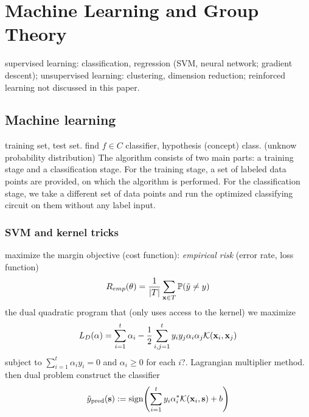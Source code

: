 \printbibliography
\appendix

\section{Machine Learning and Group Theory}
supervised learning: classification, regression
(SVM, neural network; gradient descent);
unsupervised learning: clustering, dimension reduction;
reinforced learning not discussed in this paper.
\subsection{Machine learning}
training set, test set.
find $f\in C$ classifier, hypothesis (concept) class. (unknow probability distribution)
The algorithm consists of two main parts: a training stage and a classification stage. 
For the training stage, a set of labeled data points are provided, on which the algorithm is performed. 
For the classification stage, we take a different set of data points and run the optimized classifying circuit on them without any label input.

\subsubsection{SVM and kernel tricks}
maximize the margin
objective (cost function): \emph{empirical risk} (error rate, loss function)
\begin{equation}
	R_{emp}(\vb{\theta}) = \frac{1}{\abs{T}}
	\sum_{\vb{x}\in T} \mathbb{P} (\tilde{y} \neq y)
\end{equation}
the dual quadratic program that (only uses access to the kernel)
we maximize 
\begin{equation}
	L_D(\alpha) = \sum_{i=1}^t \alpha_i - \frac{1}{2}\sum_{i,j=1}^t y_i y_j \alpha_i \alpha_j \mathcal{K}(\vb{x}_i,\vb{x}_j)
\end{equation}
subject to $\sum_{i=1}^t \alpha_i y_i = 0$ and $\alpha_i\ge 0$ for each $i$?.
Lagrangian multiplier method. then dual problem
construct the classifier
\begin{equation}
	\tilde{y}_{\textup{pred}}(\vb{s}) := \textup{sign} \qty(
		\sum_{i=1}^t y_i \alpha_i^* \mathcal{K}(\vb{x}_i,\vb{s}) + b
	)
\end{equation}

